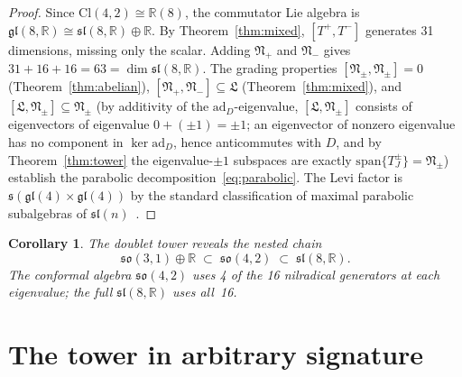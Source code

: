 \documentclass{birkjour}
\newtheorem{cor}[thm]{Corollary}
\theoremstyle{definition}
\theoremstyle{remark}
\numberwithin{equation}{section}
\newcommand{\Cl}{\mathrm{Cl}}
\newcommand{\so}{\mathfrak{so}}
\newcommand{\slR}{\mathfrak{sl}}
\newcommand{\glR}{\mathfrak{gl}}
\newcommand{\fkN}{\mathfrak{N}}
\newcommand{\fkL}{\mathfrak{L}}
\newcommand{\R}{\mathbb{R}}
\newcommand{\ad}{\mathrm{ad}}
\providecommand{\rev}{{}}
\begin{document}
\begin{proof}
Since $\Cl(4,2)\cong\R(8)$, the commutator Lie algebra
is $\glR(8,\R)\cong\slR(8,\R)\oplus\R$.
By Theorem~\ref{thm:mixed}, $[T^+,T^-]$ generates 31
dimensions, missing only the scalar.
Adding $\fkN_+$ and $\fkN_-$ gives
$31+16+16=63=\dim\slR(8,\R)$.
The grading properties
$[\fkN_\pm,\fkN_\pm]=0$ (Theorem~\ref{thm:abelian}),
$[\fkN_+,\fkN_-]\subseteq\fkL$
(Theorem~\ref{thm:mixed}), and
$[\fkL,\fkN_\pm]\subseteq\fkN_\pm$ \rev{(by additivity of
the $\ad_D$-eigenvalue, $[\fkL,\fkN_\pm]$ consists of
eigenvectors of eigenvalue $0+(\pm1)=\pm1$; an eigenvector
of nonzero eigenvalue has no component in
$\ker\ad_D$, hence anticommutes with $D$, and by
Theorem~\ref{thm:tower} the eigenvalue-$\pm1$ subspaces are
exactly $\mathrm{span}\{T^\pm_J\}=\fkN_\pm$)} establish the
parabolic decomposition~\eqref{eq:parabolic}.
The Levi factor is
$\mathfrak{s}(\glR(4)\times\glR(4))$ by the
standard classification of maximal parabolic subalgebras
of $\slR(n)$~\cite{Richardson1992}.
\end{proof}

\begin{cor}\label{cor:hierarchy}
The doublet tower reveals the nested chain
\begin{equation}
\so(3,1)\oplus\R
\;\subset\;
\so(4,2)
\;\subset\;
\slR(8,\R).
\end{equation}
The conformal algebra $\so(4,2)$ uses 4 of the 16
nilradical generators at each eigenvalue; the full
$\slR(8,\R)$ uses all~16.
\end{cor}


\section{The tower in arbitrary signature}\label{sec:general}
\end{document}
